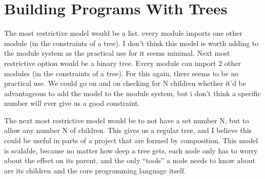 \documentclass{article}
\begin{document}

\section{Building Programs With Trees}

The most restrictive model would be a list. every module imports one other module (in the constraints of a tree).
I don't think this model is worth adding to the module system as the practical use for it seems minimal.
Next most restrictive option would be a binary tree. Every module can import 2 other modules (in the constraints of a tree). For this again, there seems to be no practical use.
We could go on and on checking for N children whether it'd be advantageous to add the model to the module system, but i don't think a specific number will ever give us a good constraint.

The next most restrictive model would be to not have a set number N, but to allow any number N of children. This gives us a regular tree, and I believe this could be useful in parts of a project that are formed by composition. This model is scalable, because no matter how deep a tree gets, each node only has to worry about the effect on its parent, and the only “tools” a node needs to know about are its children and the core programming language itself.

\end{document}
